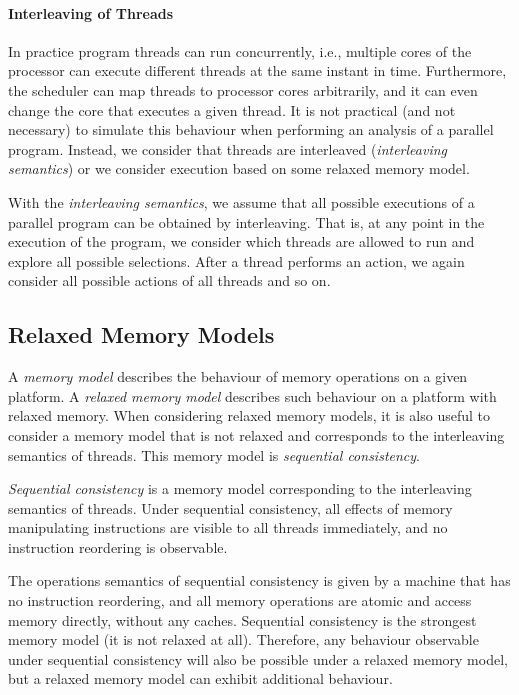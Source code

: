 \paragraph{Interleaving of Threads}

In practice program threads can run concurrently, i.e., multiple cores of the
processor can execute different threads at the same instant in time.
Furthermore, the scheduler can map threads to processor cores arbitrarily, and
it can even change the core that executes a given thread.
It is not practical (and not necessary) to simulate this behaviour when
performing an analysis of a parallel program.
Instead, we consider that threads are interleaved (\emph{interleaving
semantics}) or we consider execution based on some relaxed memory model.

\begin{definition}
    With the \emph{interleaving semantics}, we assume that all possible
    executions of a parallel program can be obtained by interleaving.
    That is, at any point in the execution of the program, we consider which
    threads are allowed to run and explore all possible selections.
    After a thread performs an action, we again consider all possible actions
    of all threads and so on.
\end{definition}



\subsection{Relaxed Memory Models}

A \emph{memory model} describes the behaviour of memory operations on a given platform.
A \emph{relaxed memory model} describes such behaviour on a platform with relaxed memory.
When considering relaxed memory models, it is also useful to consider a memory
model that is not relaxed and corresponds to the interleaving semantics of
threads.
This memory model is \emph{sequential consistency}.

\begin{definition}
    \emph{Sequential consistency} is a memory model corresponding to the
    interleaving semantics of threads.
    Under sequential consistency, all effects of memory manipulating
    instructions are visible to all threads immediately, and no instruction
    reordering is observable.
\end{definition}

The operations semantics of sequential consistency is given by a machine that has no instruction reordering, and all memory operations are atomic and access memory directly, without any caches.
Sequential consistency is the strongest memory model (it is not relaxed at all).
Therefore, any behaviour observable under sequential consistency will also be possible under a relaxed memory model, but a relaxed memory model can exhibit additional behaviour.

